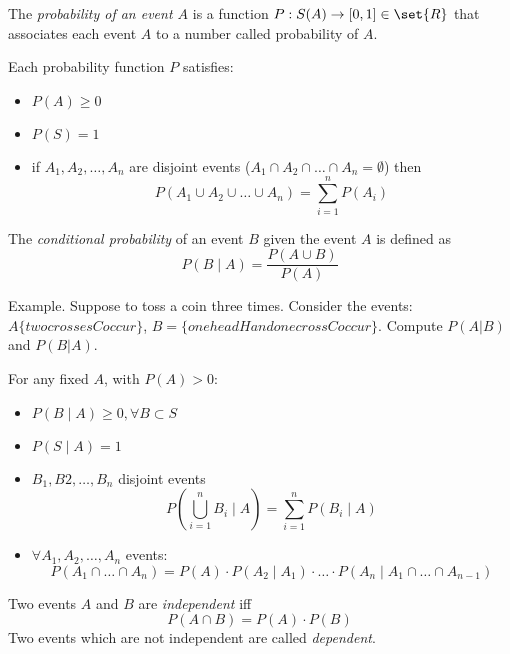 \begin{definition}
    The \textit{probability of an event $A$} is a function $P: S(A) \rightarrow [0,1] \in \set{R}$ that associates each event $A$ to a number called probability of $A$.
\end{definition}

\begin{proposition}
    Each probability function $P$ satisfies:
    
    \begin{itemize}
        \item $P(A) \geq 0$
        \item $P(S) = 1$
        \item if $A_1, A_2, \hdots, A_n$ are disjoint events ($A_1 \cap A_2 \cap \hdots \cap A_n = \emptyset$) then
        $$ P(A_1 \cup A_2 \cup \hdots \cup A_n) = \sum_{i=1}^{n}{P(A_i)} $$
    \end{itemize}
\end{proposition}

\begin{definition}
    The \textit{conditional probability} of an event $B$ given the event $A$ is defined as
    $$ P(B \mid A) = \frac{P(A \cup B)}{P(A)} $$
\end{definition}

Example. Suppose to toss a coin three times. Consider the events:
$A\{ two crosses C occur\}$, $B=\{one head H and one cross C occur \}$. Compute $P(A|B)$ and $P(B|A)$.

\begin{proposition}
    For any fixed $A$, with $P(A) > 0$:
    
    \begin{itemize}
        \item $P(B \mid A) \geq 0, \forall B \subset S$
        \item $P(S \mid A) = 1$
        \item $B_1, B2, \hdots, B_n$ disjoint events
        $$ P\left(\bigcup_{i = 1}^{n}{B_i} \mid A\right) = \sum_{i=1}^{n}P(B_i \mid A) $$
        \item $\forall A_1, A_2, \hdots, A_n$ events:
        $$ P(A_1 \cap \hdots \cap A_n) = P(A) \cdot P(A_2 \mid A_1) \cdot \hdots \cdot P(A_n \mid A_1 \cap \hdots \cap A_{n-1}) $$
    \end{itemize}
\end{proposition}

\begin{definition}
    Two events $A$ and $B$ are \textit{independent} iff
    $$ P(A \cap B) = P(A) \cdot P(B) $$
    Two events which are not independent are called \textit{dependent}.
\end{definition}

